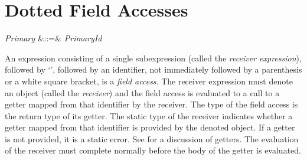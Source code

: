 %
%
%
%

\section{Dotted Field Accesses}

\begin{Grammar}
\emph{Primary} &::=& \emph{Primary}\emph{Id}\\
\end{Grammar}

An expression consisting of a single subexpression (called the
\emph{receiver expression}), followed by `', followed by an
identifier, not immediately followed by a parenthesis or a white
square bracket, is a
\emph{field access}.
The receiver expression must denote an object
(called the \emph{receiver}) and the field access is evaluated to a call
to a getter mapped from that identifier by the receiver.
The type of the field access is the return type of its getter.
The static type of
the receiver indicates whether a getter mapped from that identifier is
provided by the denoted object.  If a getter is not provided, it is a
static error.
See  for a discussion of getters.
The evaluation of the receiver must complete normally before the body of
the getter is evaluated.
